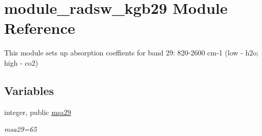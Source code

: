 \hypertarget{namespacemodule__radsw__kgb29}{}\section{module\+\_\+radsw\+\_\+kgb29 Module Reference}
\label{namespacemodule__radsw__kgb29}


This module sets up absorption coeffients for band 29\+: 820-\/2600 cm-\/1 (low -\/ h2o; high -\/ co2)  


\subsection*{Variables}
\begin{DoxyCompactItemize}
\item 
\mbox{\label{namespacemodule__radsw__kgb29_adbee6e5d3b3efc437ff8815e42962b92}} 
integer, public \hyperlink{namespacemodule__radsw__kgb29_adbee6e5d3b3efc437ff8815e42962b92}{msa29}
\begin{DoxyCompactList}\small\item\em msa29=65 \end{DoxyCompactList}\end{DoxyCompactItemize}
